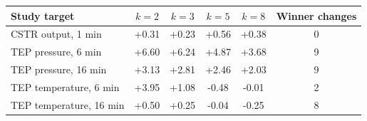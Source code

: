 \begin{tabular}{@{}lccccc@{}}
\toprule
Study target & $k=2$ & $k=3$ & $k=5$ & $k=8$ & Winner changes \\
\midrule
CSTR output, 1 min & +0.31 & +0.23 & +0.56 & +0.38 & 0 \\
TEP pressure, 6 min & +6.60 & +6.24 & +4.87 & +3.68 & 9 \\
TEP pressure, 16 min & +3.13 & +2.81 & +2.46 & +2.03 & 9 \\
TEP temperature, 6 min & +3.95 & +1.08 & -0.48 & -0.01 & 2 \\
TEP temperature, 16 min & +0.50 & +0.25 & -0.04 & -0.25 & 8 \\
\bottomrule
\end{tabular}
